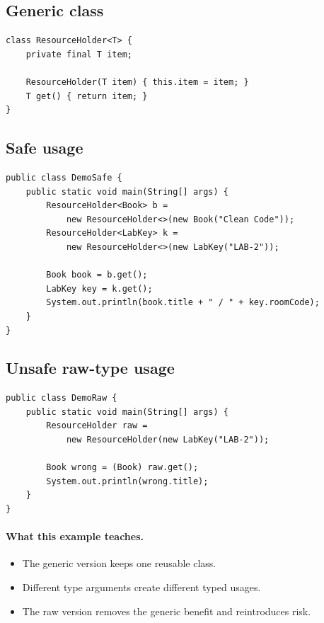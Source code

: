 \documentclass[11pt]{article}
\begin{document}
\subsection*{Generic class}
\begin{lstlisting}
class ResourceHolder<T> {
    private final T item;

    ResourceHolder(T item) { this.item = item; }
    T get() { return item; }
}
\end{lstlisting}

\subsection*{Safe usage}
\begin{lstlisting}
public class DemoSafe {
    public static void main(String[] args) {
        ResourceHolder<Book> b =
            new ResourceHolder<>(new Book("Clean Code"));
        ResourceHolder<LabKey> k =
            new ResourceHolder<>(new LabKey("LAB-2"));

        Book book = b.get();
        LabKey key = k.get();
        System.out.println(book.title + " / " + key.roomCode);
    }
}
\end{lstlisting}

\subsection*{Unsafe raw-type usage}
\begin{lstlisting}
public class DemoRaw {
    public static void main(String[] args) {
        ResourceHolder raw =
            new ResourceHolder(new LabKey("LAB-2"));

        Book wrong = (Book) raw.get();
        System.out.println(wrong.title);
    }
}
\end{lstlisting}

\paragraph{What this example teaches.}
\begin{itemize}
  \item The generic version keeps one reusable class.
  \item Different type arguments create different typed usages.
  \item The raw version removes the generic benefit and reintroduces risk.
\end{itemize}
\end{document}
